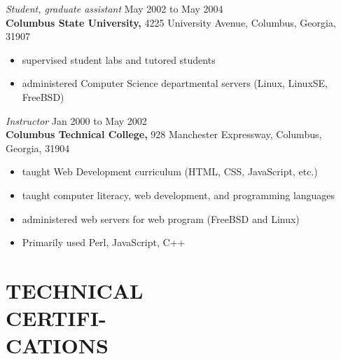\documentclass[margin, 10pt]{res} %
\begin{document}
\begin{resume}
{\it Student, graduate assistant} \hfill May 2002 to May 2004 \\
\textbf{Columbus State University,} \hfill 4225 University Avenue, Columbus, Georgia, 31907

\begin{itemize} \itemsep -2pt %
            \footnotesize
\item supervised student labs and tutored students
\item administered Computer Science departmental servers (Linux, LinuxSE, FreeBSD)
\end{itemize}

{\it Instructor} \hfill Jan 2000 to May 2002 \\
\textbf{Columbus Technical College,} \hfill 928 Manchester Expressway, Columbus, Georgia, 31904
\begin{itemize} \itemsep -2pt %
            \footnotesize
        \item taught Web Development curriculum (HTML, CSS, JavaScript, etc.)
\item taught computer literacy, web development, and programming languages
\item administered web servers for web program (FreeBSD and Linux)
\item Primarily used Perl, JavaScript, C++
\end{itemize}


\section{TECHNICAL\\CERTIFI-\\CATIONS\\
}


\end{resume}
\end{document}
